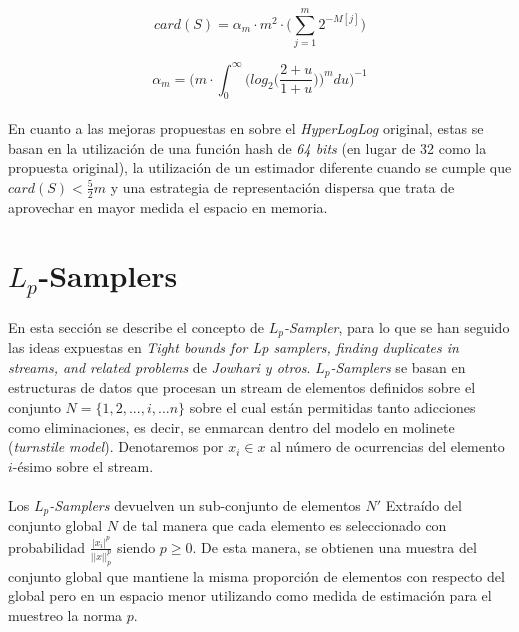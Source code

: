\documentclass{subfiles}
\begin{document}
      \begin{equation}
      \label{eq:hyper_log_log_estimation}
        card(S) = \alpha_m \cdot m^2 \cdot \bigg( \sum_{j=1}^{m}2^{-M[j]}\bigg)
      \end{equation}

      \begin{equation}
      \label{eq:hyper_log_log_alpha}
        \alpha_m = \bigg(m \cdot \int_0^\infty \bigg(log_2\bigg(\frac{2+u}{1+u}\bigg)\bigg)^m du\bigg)^{-1}
      \end{equation}

      \paragraph{}
      En cuanto a las mejoras propuestas en \cite{heule2013hyperloglog} sobre el \emph{HyperLogLog} original, estas se basan en la utilización de una función hash de \emph{64 bits} (en lugar de 32 como la propuesta original), la utilización de un estimador diferente cuando se cumple que $card(S) < \frac{5}{2}m$ y una estrategia de representación dispersa que trata de aprovechar en mayor medida el espacio en memoria.

    \section{$L_p$-Samplers}
    \label{sec:lp_samplers}

      \paragraph{}
      En esta sección se describe el concepto de \emph{$L_p$-Sampler}, para lo que se han seguido las ideas expuestas en \emph{Tight bounds for Lp samplers, finding duplicates in streams, and related problems} \cite{jowhari2011tight} de \emph{Jowhari y otros}. \emph{$L_p$-Samplers} se basan en estructuras de datos que procesan un stream de elementos definidos sobre el conjunto $N= \{1, 2, ...,i, ...n\}$ sobre el cual están permitidas tanto adicciones como eliminaciones, es decir, se enmarcan dentro del modelo en molinete (\emph{turnstile model}). Denotaremos por $x_i \in x$ al número de ocurrencias del elemento $i$-ésimo sobre el stream.

      \paragraph{}
      Los \emph{$L_p$-Samplers} devuelven un sub-conjunto de elementos $N'$ Extraído del conjunto global $N$ de tal manera que cada elemento es seleccionado con probabilidad $\frac{|x_i|^p}{||x||_p^p}$ siendo $p\geq0$. De esta manera, se obtienen una muestra del conjunto global que mantiene la misma proporción de elementos con respecto del global pero en un espacio menor utilizando como medida de estimación para el muestreo la norma $p$.
\end{document}
